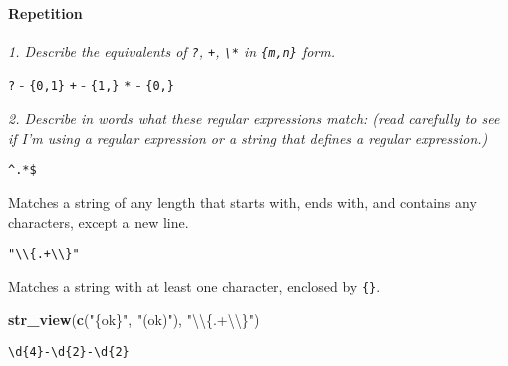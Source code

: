 \documentclass[]{article}
\newenvironment{Shaded}{\begin{snugshade}}{\end{snugshade}}
\newcommand{\KeywordTok}[1]{\textcolor[rgb]{0.13,0.29,0.53}{\textbf{#1}}}
\newcommand{\CharTok}[1]{\textcolor[rgb]{0.31,0.60,0.02}{#1}}
\newcommand{\StringTok}[1]{\textcolor[rgb]{0.31,0.60,0.02}{#1}}
\newcommand{\NormalTok}[1]{#1}
\let\oldparagraph\paragraph
\renewcommand{\paragraph}[1]{\oldparagraph{#1}\mbox{}}
\theoremstyle{definition}
\theoremstyle{definition}
\theoremstyle{definition}
\theoremstyle{remark}
\begin{document}
\hypertarget{htmlwidget-8de6719a1b330527a347}{}

\paragraph{Repetition}\label{repetition}

\emph{1. Describe the equivalents of \texttt{?}, \texttt{+},
\texttt{\textbackslash{}*} in \texttt{\{m,n\}} form.}

\texttt{?} - \texttt{\{0,1\}} \texttt{+} - \texttt{\{1,\}} \texttt{*} -
\texttt{\{0,\}}

\emph{2. Describe in words what these regular expressions match: (read
carefully to see if I'm using a regular expression or a string that
defines a regular expression.)}

\texttt{\^{}.*\$}

Matches a string of any length that starts with, ends with, and contains
any characters, except a new line.

\begin{Shaded}
\end{Shaded}

\hypertarget{htmlwidget-7fb4f3266174a4cbb06b}{}

\texttt{"\textbackslash{}\textbackslash{}\{.+\textbackslash{}\textbackslash{}\}"}

Matches a string with at least one character, enclosed by \texttt{\{\}}.

\begin{Shaded}
\begin{Highlighting}[]
\KeywordTok{str_view}\NormalTok{(}\KeywordTok{c}\NormalTok{(}\StringTok{"\{ok\}"}\NormalTok{, }\StringTok{"(ok)"}\NormalTok{), }\StringTok{"}\CharTok{\textbackslash{}\textbackslash{}}\StringTok{\{.+}\CharTok{\textbackslash{}\textbackslash{}}\StringTok{\}"}\NormalTok{)}
\end{Highlighting}
\end{Shaded}

\hypertarget{htmlwidget-8c8f98e8b821832bdb01}{}

\texttt{\textbackslash{}d\{4\}-\textbackslash{}d\{2\}-\textbackslash{}d\{2\}}
\end{document}
